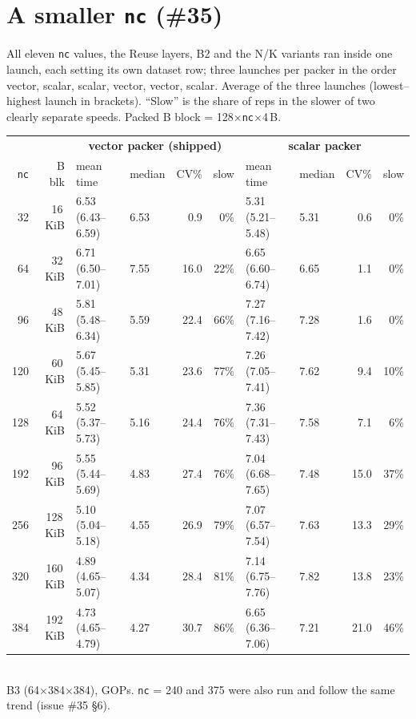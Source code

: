 \documentclass[10pt,a4paper]{article}
\newcommand{\slow}[1]{\textcolor{red!70!black}{#1}}
\newcommand{\steady}[1]{\textcolor{green!45!black}{#1}}
\begin{document}
\section{A smaller \texttt{nc} (\#35)}
All eleven \texttt{nc} values, the Reuse layers, B2 and the N/K variants ran inside one launch, each setting its own
dataset row; three launches per packer in the order vector, scalar, scalar, vector, vector, scalar. Average of the
three launches (lowest--highest launch in brackets). ``Slow'' is the share of reps in the slower of two clearly
separate speeds. Packed B block = 128$\times$\texttt{nc}$\times$4\,B.

\begin{center}\small
\begin{tabular}{rr|llrr|llrr}
\toprule
& & \multicolumn{4}{c|}{\textbf{vector packer (shipped)}} & \multicolumn{4}{c}{\textbf{scalar packer}} \\
\texttt{nc} & B blk & mean time & median & CV\% & slow & mean time & median & CV\% & slow \\
\midrule
32  & 16\,KiB  & \steady{6.53} (6.43--6.59) & 6.53 & 0.9  & 0\%  & 5.31 (5.21--5.48) & 5.31 & 0.6  & 0\% \\
64  & 32\,KiB  & 6.71 (6.50--7.01) & 7.55 & 16.0 & 22\% & 6.65 (6.60--6.74) & 6.65 & 1.1  & 0\% \\
96  & 48\,KiB  & 5.81 (5.48--6.34) & 5.59 & 22.4 & 66\% & \steady{7.27} (7.16--7.42) & 7.28 & 1.6  & 0\% \\
120 & 60\,KiB  & 5.67 (5.45--5.85) & 5.31 & 23.6 & 77\% & 7.26 (7.05--7.41) & 7.62 & 9.4  & 10\% \\
128 & 64\,KiB  & 5.52 (5.37--5.73) & 5.16 & 24.4 & 76\% & \steady{7.36} (7.31--7.43) & 7.58 & 7.1  & 6\% \\
192 & 96\,KiB  & 5.55 (5.44--5.69) & 4.83 & 27.4 & 76\% & 7.04 (6.68--7.65) & 7.48 & 15.0 & 37\% \\
256 & 128\,KiB & 5.10 (5.04--5.18) & 4.55 & 26.9 & 79\% & 7.07 (6.57--7.54) & 7.63 & 13.3 & 29\% \\
320 & 160\,KiB & 4.89 (4.65--5.07) & 4.34 & 28.4 & 81\% & 7.14 (6.75--7.76) & 7.82 & 13.8 & 23\% \\
384 & 192\,KiB & \slow{4.73} (4.65--4.79) & 4.27 & 30.7 & 86\% & \slow{6.65} (6.36--7.06) & 7.21 & 21.0 & 46\% \\
\bottomrule
\end{tabular}\\[2pt]
{\footnotesize B3 (64$\times$384$\times$384), GOPs. \texttt{nc} = 240 and 375 were also run and follow the same trend (issue \#35 \S6).}
\end{center}
\end{document}
